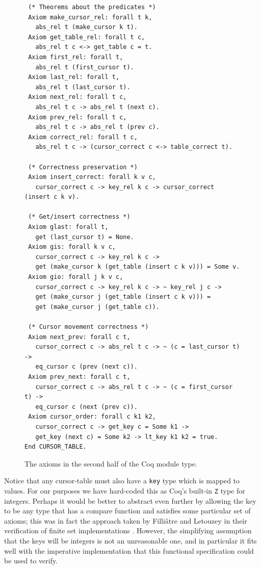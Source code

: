 \documentclass[12pt]{article}
\begin{document}
\begin{figure}[p]
\begin{singlespace}
\begin{verbatim}
 (* Theorems about the predicates *)
 Axiom make_cursor_rel: forall t k,
   abs_rel t (make_cursor k t).
 Axiom get_table_rel: forall t c,
   abs_rel t c <-> get_table c = t.
 Axiom first_rel: forall t,
   abs_rel t (first_cursor t).
 Axiom last_rel: forall t,
   abs_rel t (last_cursor t).
 Axiom next_rel: forall t c,
   abs_rel t c -> abs_rel t (next c).
 Axiom prev_rel: forall t c,
   abs_rel t c -> abs_rel t (prev c).
 Axiom correct_rel: forall t c,
   abs_rel t c -> (cursor_correct c <-> table_correct t).
   
 (* Correctness preservation *)
 Axiom insert_correct: forall k v c,
   cursor_correct c -> key_rel k c -> cursor_correct (insert c k v).
   
 (* Get/insert correctness *)
 Axiom glast: forall t,
   get (last_cursor t) = None.
 Axiom gis: forall k v c,
   cursor_correct c -> key_rel k c ->
   get (make_cursor k (get_table (insert c k v))) = Some v.
 Axiom gio: forall j k v c,
   cursor_correct c -> key_rel k c -> ~ key_rel j c ->
   get (make_cursor j (get_table (insert c k v))) =
   get (make_cursor j (get_table c)).
 
 (* Cursor movement correctness *)
 Axiom next_prev: forall c t,
   cursor_correct c -> abs_rel t c -> ~ (c = last_cursor t) ->
   eq_cursor c (prev (next c)).
 Axiom prev_next: forall c t,
   cursor_correct c -> abs_rel t c -> ~ (c = first_cursor t) ->
   eq_cursor c (next (prev c)).
 Axiom cursor_order: forall c k1 k2,
   cursor_correct c -> get_key c = Some k1 ->
   get_key (next c) = Some k2 -> lt_key k1 k2 = true.
End CURSOR_TABLE.
\end{verbatim}
\caption{The axioms in the second half of the Coq module type.}
\label{fig:axioms}
\end{singlespace}
\end{figure}

Notice that any cursor-table must also have a \texttt{key} type which is mapped to values. For our purposes we have hard-coded this as Coq’s built-in \texttt{Z} type for integers. Perhaps it would be better to abstract even further by allowing the key to be any type that has a compare function and satisfies some particular set of axioms; this was in fact the approach taken by Filliâtre and Letouzey in their verification of finite set implementations \cite{filliatre:hal-00150913}. However, the simplifying assumption that the keys will be integers is not an unreasonable one, and in particular it fits well with the imperative implementation that this functional specification could be used to verify.
\end{document}

